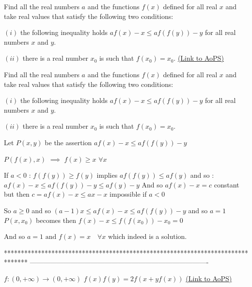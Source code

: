 \begin{problem}
	Find all the real numbers  $a $ and the functions  $f (x)$ defined for all real  $x $ and take real values that satisfy the following two conditions:

$(i) $ the following inequality holds  $af(x)-x\le af (f (y))-y $ for all real numbers  $x $ and $y$.

$(ii)$ there is  a real number  $x_{0} $ is such that  $f (x_{0})=x_{0}$.
	\flushright \href{https://artofproblemsolving.com/community/c6h1626623}{(Link to AoPS)}
\end{problem}



\begin{solution}
	\begin{tcolorbox}Find all the real numbers  $a $ and the functions  $f (x)$ defined for all real  $x $ and take real values that satisfy the following two conditions:

$(i) $ the following inequality holds  $af(x)-x\le af (f (y))-y $ for all real numbers  $x $ and $y$.

$(ii)$ there is  a real number  $x_{0} $ is such that  $f (x_{0})=x_{0}$.\end{tcolorbox}
Let $P(x,y)$ be the assertion $af(x)-x\le af(f(y))-y$

$P(f(x),x)$ $\implies$ $f(x)\ge x$ $\forall x$

If $a<0$ : $f(f(y))\ge f(y)$ implies $af(f(y))\le af(y)$ and so :
$af(x)-x\le af(f(y))-y\le af(y)-y$
And so $af(x)-x=c$ constant but then $c=af(x)-x\le ax-x$ impossible if $a<0$

So $a\ge 0$ and so $(a-1)x\le af(x)-x\le af(f(y))-y$ and so $a=1$
$P(x,x_0)$ becomes then $f(x)-x\le f(f(x_0))-x_0=0$

And so $\boxed{a=1\text{  and  }f(x)=x\quad\forall x}$ which indeed is a solution.


\end{solution}
*******************************************************************************
-------------------------------------------------------------------------------

\begin{problem}
	$f: (0,+\infty)\rightarrow (0,+\infty)$
$f(x)f(y)=2f(x+yf(x))$
	\flushright \href{https://artofproblemsolving.com/community/c6h1626670}{(Link to AoPS)}
\end{problem}



